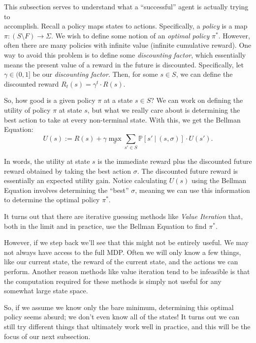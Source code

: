 \documentclass[12pt,oneside,oldfontcommands]{memoir}
\theoremstyle{definition}
\newcommand{\s}{\sigma}
\begin{document}
\begin{Subsection}
This subsection serves to understand what a ``successful'' agent is actually trying to\\
accomplish. 
\tcblower
Recall a policy maps states to actions. Specifically, a \textit{policy} is a map $\pi : (S \setminus F) \to \Sigma$. We wish to define some notion of an \textit{optimal policy} $\pi^*$. However, often there are many policies with infinite value (infinite cumulative reward). One way to avoid this problem is to define some \textit{discounting factor}, which essentially means the present value of a reward in the future is discounted. Specifically, let $\gamma \in (0,1]$ be our \textit{discounting factor}. Then, for some $s \in S$, we can define the discounted reward $R_t(s) = \gamma^t \cdot R(s)$.

So, how good is a given policy $\pi$ at a state $s \in S$? We can work on defining the utility of policy $\pi$ at state $s$, but what we really care about is determining the best action to take at every non-terminal state. With this, we get the Bellman Equation:
\begin{equation}\label{bell}
U(s) := R(s) + \gamma \max_\s \sum_{s' \in S} \mathbb{P}[s' \ |\ (s,\s)] \cdot U(s').
\end{equation}

In words, the utility at state $s$ is the immediate reward plus the discounted future reward obtained by taking the best action $\s$. The discounted future reward is essentially an expected utility gain. Notice calculating $U(s)$ using the Bellman Equation involves determining the ``best'' $\s$, meaning we can use this information to determine the optimal policy $\pi^*$. 

It turns out that there are iterative guessing methods like \textit{Value Iteration} that, both in the limit and in practice, use the Bellman Equation to find $\pi^*$. 

However, if we step back we'll see that this might not be entirely useful. We may not always have access to the full MDP. Often we will only know a few things, like our current state, the reward of the current state, and the actions we can perform. Another reason methods like value iteration tend to be infeasible is that the computation required for these methods is simply not useful for any somewhat large state space. 

So, if we assume we know only the bare minimum, determining this optimal policy seems absurd; we don't even know all of the states! It turns out we can still try different things that ultimately work well in practice, and this will be the focus of our next subsection. 
\end{Subsection}
\end{document}
